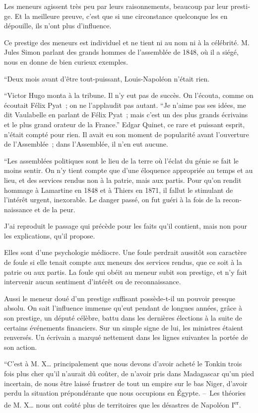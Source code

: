 \documentclass[french,twoside]{book} %
\begin{document}
Les meneurs agissent très peu par leurs raisonnements, beaucoup par leur presti­ge. Et la meilleure preuve, c’est que si une circonstance quelconque les en dépouille, ils n’ont plus d’influence.\par
Ce prestige des meneurs est individuel et ne tient ni au nom ni à la célébrité. M. Jules Simon parlant des grands hommes de l’assemblée de 1848, où il a siégé, nous en donne de bien curieux exemples.\par
“Deux mois avant d’être tout-puissant, Louis-Napoléon n’était rien.\par
“Victor Hugo monta à la tribune. Il n’y eut pas de succès. On l’écouta, comme on écoutait Félix Pyat ; on ne l’applaudit pas autant. “Je n’aime pas ses idées, me dit Vaulabelle en parlant de Félix Pyat ; mais c’est un des plus grands écrivains et le plus grand orateur de la France.” Edgar Quinet, ce rare et puissant esprit, n’était compté pour rien. Il avait eu son moment de popularité avant l’ouverture de l’Assemblée ; dans l’Assemblée, il n’en eut aucune.\par
“Les assemblées politiques sont le lieu de la terre où l’éclat du génie se fait le moins sentir. On n’y tient compte que d’une éloquence appropriée au temps et au lieu, et des services rendus non à la patrie, mais aux partis. Pour qu’on rendit hommage à Lamartine en 1848 et à Thiers en 1871, il fallut le stimulant de l’intérêt urgent, inexo­rable. Le danger passé, on fut guéri à la fois de la recon­naissance et de la peur.\par
J’ai reproduit le passage qui précède pour les faits qu’il contient, mais non pour les explications, qu’il propose.\par
Elles sont d’une psychologie médiocre. Une foule perdrait aussitôt son caractère de foule si elle tenait compte aux meneurs des services rendus, que ce soit à la patrie ou aux partis. La foule qui obéit au meneur subit son prestige, et n’y fait intervenir aucun sentiment d’intérêt ou de reconnaissance.\par
Aussi le meneur doué d’un prestige suffisant possède-t-il un pouvoir presque absolu. On sait l’influence immense qu’eut pendant de longues années, grâce à son prestige, un député célèbre, battu dans les dernières élections à la suite de certains événements financiers. Sur un simple signe de lui, les ministres étaient renversés. Un écrivain a marqué nettement dans les lignes suivantes la portée de son action.\par
“C’est à M. X… principalement que nous devons d’avoir acheté le Tonkin trois fois plus cher qu’il n’aurait dû coûter, de n’avoir pris dans Madagascar qu’un pied incertain, de nous être laissé frustrer de tout un empire sur le bas Niger, d’avoir perdu la situation prépondérante que nous occupions en Égypte. – Les théories de M. X… nous ont coûté plus de territoires que les désastres de Napoléon I\textsuperscript{er}.\par
\end{document}
